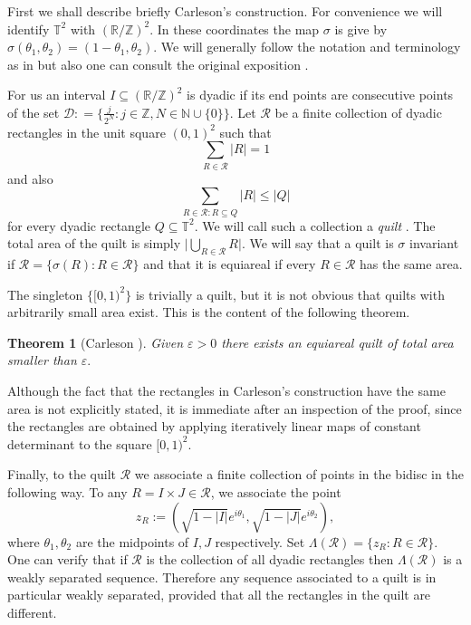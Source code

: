 \documentclass{amsart}
\numberwithin{equation}{section}
\newtheorem{thm}{Theorem}[section]
\begin{document}
First we shall describe briefly Carleson's construction. For convenience we will identify $\mathbb{T}^2 $  with $(\mathbb{R}/\mathbb{Z})^2 $. In these coordinates the map $\sigma $ is give by $\sigma(\theta_1, \theta_2) = (1-\theta_1,\theta_2). $  We will generally follow the notation and terminology as in \cite{Tao} but also one can consult the original exposition \cite{Carleson74}.

For us  an interval $ I \subseteq (\mathbb{R}/\mathbb{Z})^2 $ is dyadic if its end points are consecutive points of the set 
$\mathcal{D}: = \{ \frac{j}{2^N}: j\in \mathbb{Z}, N \in \mathbb{N}\cup \{0\} \}$. 
Let $\mathcal{R} $ be a finite collection of dyadic 
 rectangles in the unit square $ (0,1)^2 $ such that 
 \begin{equation}\sum_{R \in \mathcal{R}} |R| = 1  \end{equation}
and also 
\begin{equation} \label{eq:quilt_property}
	\sum_{R\in \mathcal{R}: R\subseteq Q}|R| \leq |Q|
\end{equation}
for every dyadic  rectangle $ Q \subseteq \mathbb{T}^2. $
We will call such a collection a {\it quilt} \cite[Section 7]{Tao}.
The total area of the quilt is simply $\Big| \bigcup_{R\in \mathcal{R}} R \Big| $. We will say that a quilt is $\sigma $ invariant
if $\mathcal{R} = \{ \sigma(R) : R \in \mathcal{R}\} $ and that it is equiareal if every $ R\in \mathcal{R} $ has the same 
area.

The singleton $ \{ [0,1)^2 \} $ is trivially a quilt, but it is not obvious that quilts with arbitrarily small area exist. This is the content of the following theorem. 

\begin{thm}[Carleson \cite{Carleson74}]
	Given $\varepsilon > 0 $  there exists an equiareal quilt of total area smaller than $\varepsilon. $ 
\end{thm}
 
Although the fact that the rectangles in Carleson's construction have the same area is not explicitly stated, it is immediate after an inspection of the proof, since the rectangles are obtained by applying iteratively linear maps of constant determinant to the square $[0,1)^2. $ 

Finally, to the quilt $\mathcal{R} $ we associate a finite collection of points in the bidisc in the following way. 
To any $R = I \times J \in \mathcal{R} $, we associate the point 
\begin{equation}
\label{eqn:z_R}
z_R := (\sqrt{1-|I|}e^{i\theta_1},\sqrt{1-|J|}e^{i\theta_2}), 
\end{equation}
where $\theta_1,\theta_2 $ are
the midpoints of $I,J $ respectively. Set $\Lambda(\mathcal{R}) = \{ z_R : R\in \mathcal{R} \} $. 
One can verify that if $\mathcal{R} $ is the collection of all dyadic rectangles then $\Lambda(\mathcal{R}) $ 
is a weakly separated sequence. Therefore any sequence associated to a quilt is 
in particular weakly separated, provided that all the rectangles in the quilt are different.
\end{document}
